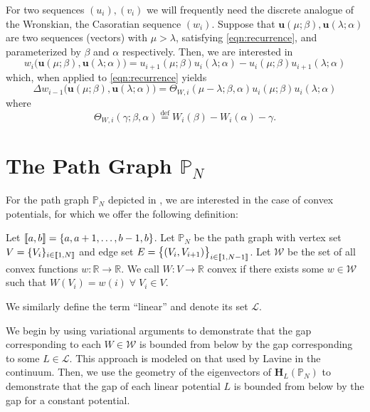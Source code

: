     For two sequences $(u_i),(v_i)$ we will frequently need the discrete analogue of the Wronskian, the Casoratian sequence $(w_i)$. Suppose that $\mathbf{u}(\mu;\beta),\mathbf{u}(\lambda;\alpha)$ are two sequences (vectors) with $\mu > \lambda$, satisfying \cref{eqn:recurrence}, and parameterized by $\beta$ and $\alpha$ respectively. Then, we are interested in
    \begin{equation}
      w_i\big(\mathbf{u}(\mu;\beta),\mathbf{u}(\lambda;\alpha)\big) = u_{i+1}(\mu;\beta)u_i(\lambda;\alpha) - u_i(\mu;\beta)u_{i+1}(\lambda;\alpha)
    \end{equation}
    which, when applied to \cref{eqn:recurrence} yields
    \begin{equation}\label{eqn:Casoratian}
      \Delta w_{i-1}\big(\mathbf{u}(\mu;\beta),\mathbf{u}(\lambda;\alpha)\big) = \Theta_{W,i}(\mu-\lambda;\beta,\alpha) u_{i}(\mu;\beta)u_i(\lambda;\alpha)
    \end{equation}
    where
    \begin{equation}\label{eqn:theta}
      \Theta_{W,i}(\gamma;\beta,\alpha) \stackrel{\text{def}}{=} W_i(\beta) - W_i(\alpha) - \gamma.
    \end{equation}

\section{The Path Graph $\mathbb{P}_{N}$}\label{sec:path}

  For the path graph $\mathbb{P}_N$ depicted in , we are interested in the case of convex potentials, for which we offer the following definition:
    \begin{definition}\label{def:convex}
      Let $\left \llbracket a , b \right \rrbracket = \{a,a+1,\dots,b-1,b\}$. Let $\mathbb{P}_N$ be the path graph with vertex set $V=\{V_i\}_{i\in \left \llbracket 1 , N \right \rrbracket}$ and edge set $E=\big\{(V_i,V_{i+1})\big\}_{i\in\left \llbracket 1 , N-1 \right \rrbracket}$. Let $\mathcal{W}$ be the set of all convex functions $w:\mathbb{R}\rightarrow\mathbb{R}$. We call $W:V\rightarrow \mathbb{R}$ convex if there exists some $w \in \mathcal{W}$ such that $W(V_i) = w(i) \; \forall \; V_i \in V$.

      We similarly define the term ``linear'' and denote its set $\mathcal{L}$.
    \end{definition}

  We begin by using variational arguments to demonstrate that the gap corresponding to each $W\in\mathcal{W}$ is bounded from below by the gap corresponding to some $L\in\mathcal{L}$. This approach is modeled on that used by Lavine in the continuum.\cite{Lavine1994} Then, we use the geometry of the eigenvectors of $\mathbf{H}_L(\mathbb{P}_N)$ to demonstrate that the gap of each linear potential $L$ is bounded from below by the gap for a constant potential.

